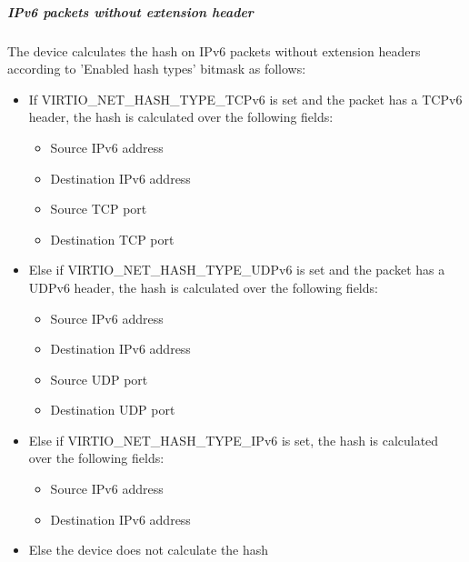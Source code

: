 \subparagraph{IPv6 packets without extension header}
\label{sec:Device Types / Network Device / Device Operation / Processing of Incoming Packets / Hash calculation for incoming packets / IPv6 packets without extension header}
The device calculates the hash on IPv6 packets without extension
headers according to 'Enabled hash types' bitmask as follows:
\begin{itemize}
\item If VIRTIO_NET_HASH_TYPE_TCPv6 is set and the packet has
a TCPv6 header, the hash is calculated over the following fields:
\begin{itemize}
\item Source IPv6 address
\item Destination IPv6 address
\item Source TCP port
\item Destination TCP port
\end{itemize}
\item Else if VIRTIO_NET_HASH_TYPE_UDPv6 is set and the
packet has a UDPv6 header, the hash is calculated over the following fields:
\begin{itemize}
\item Source IPv6 address
\item Destination IPv6 address
\item Source UDP port
\item Destination UDP port
\end{itemize}
\item Else if VIRTIO_NET_HASH_TYPE_IPv6 is set, the hash is
calculated over the following fields:
\begin{itemize}
\item Source IPv6 address
\item Destination IPv6 address
\end{itemize}
\item Else the device does not calculate the hash
\end{itemize}

